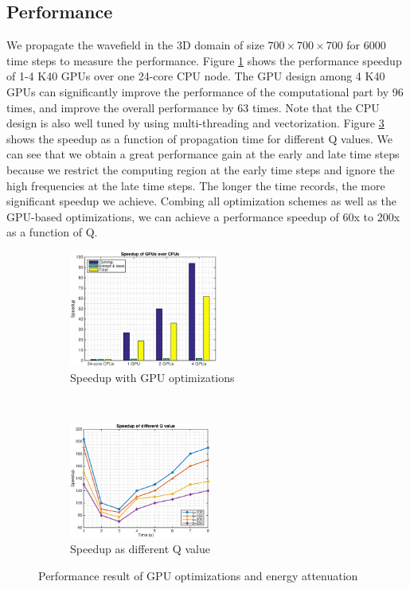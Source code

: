 \documentclass{paris17}
\begin{document}
\subsection{Performance}

We propagate the wavefield in the 3D domain of size $700\times700\times700$ for 6000 time steps to measure the performance. Figure \ref{fig:gpu-speedup} shows the performance speedup of 1-4 K40 GPUs over one 24-core CPU node. The GPU design among 4 K40 GPUs can significantly improve the performance of the computational part by 96 times, and improve the overall performance by 63 times. Note that the CPU design is also well tuned by using multi-threading and vectorization. Figure \ref{fig:q-speedup} shows the speedup as a function of propagation time for different Q values. We can see that we obtain a great performance gain at the early and late time steps because we restrict the computing region at the early time steps and ignore the high frequencies at the late time steps. The longer the time records, the more significant speedup we achieve.  Combing all optimization schemes as well as the GPU-based optimizations, we can achieve a performance speedup of 60x to 200x as a function of Q.

\begin{figure}[h]
    \centering
    \begin{subfigure}[b]{0.4\textwidth}
        \centering
        \includegraphics[height=1.5in]{./fig/speedup.eps}
        \caption{Speedup with GPU optimizations}
        \label{fig:gpu-speedup}
    \end{subfigure}%
    ~
    \begin{subfigure}[b]{0.4\textwidth}
        \centering
        \includegraphics[height=1.5in]{./fig/speedup_q.eps}
        \caption{Speedup as different Q value}
        \label{fig:q-speedup}
    \end{subfigure}
    \caption{Performance result of GPU optimizations and energy attenuation}
\end{figure}
\end{document}
